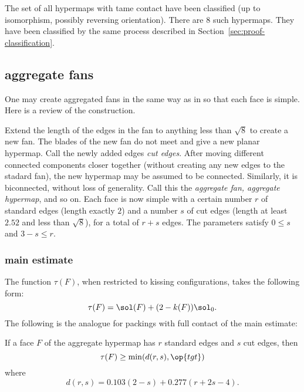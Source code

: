 The set of all hypermaps with tame contact have been classified (up to
isomorphism, possibly reversing orientation).  There are $8$ such
hypermaps.  They have been classified by the same process described in
Section~\ref{sec:proof-classification}.  %
%
%


\subsection{aggregate fans}

One may create aggregated fans in the same way as in
\cite{Hales:2006:DCG} so that each face is simple.  Here is a review
of the construction.  %
%

Extend the length of the edges in the fan to anything less than
$\sqrt8$ to create a new fan.  The blades of the new fan do not meet
and give a new planar hypermap.  Call the newly added edges {\it cut
  edges}.  After moving different connected components closer together
(without creating any new edges to the stadard fan), the new hypermap
may be assumed to be connected.  Similarly, it is biconnected, without
loss of generality.  Call this the {\it aggregate fan, aggregate
  hypermap}, and so on.  Each face is now simple with a certain number
$r$ of standard edges (length exactly $2$) and a number $s$ of cut
edges (length at least $2.52$ and less than $\sqrt8$), for a total of
$r+s$ edges.  The parameters satisfy $0\le s$ and $3-s \le r$.
%
%


\subsubsection{main estimate}

The function $\tau(F)$, when restricted to kissing configurations,
takes the following form:
\begin{displaymath}
\tau(F) = \sol(F) + (2-k(F)) \sol_0.
\end{displaymath}
%
%
The following is the analogue for packings with full contact of the
main estimate:

\begin{theorem}\label{lemma:main-estimate-12} If a face
  $F$ of the aggregate hypermap has $r$ standard edges and $s$ cut
  edges, then
\begin{displaymath}\tau(F) \ge \min(d(r,s),\op{tgt})\end{displaymath}
where 
\begin{displaymath}
d(r,s) = 0.103 (2-s) + 0.277 (r+2s-4).
\end{displaymath}
\end{theorem}

